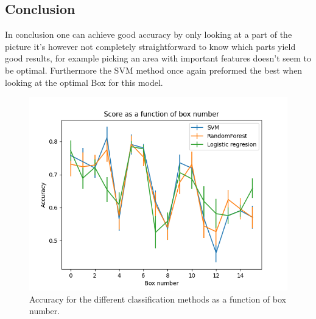 \documentclass{article}
\begin{document}
\subsection{Conclusion}
In conclusion one can achieve good accuracy by only looking at a part of the picture it's however not completely straightforward to know which parts yield good results, for example picking an area with important features doesn't seem to be optimal. Furthermore the SVM method once again preformed the best when looking at the optimal Box for this model.
\begin{figure}[H]
    \centering
    \includegraphics[scale=0.6]{2b/Result.png}
    \caption{Accuracy for the different classification methods as a function of box number.}
    \label{result 2b}
\end{figure}
\end{document}
